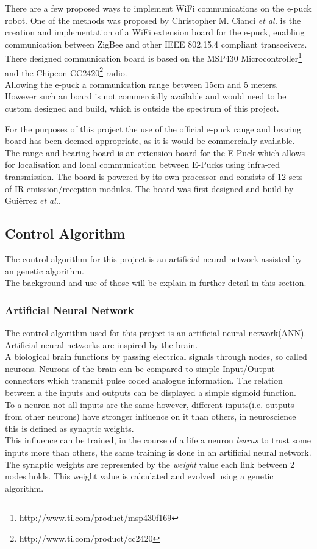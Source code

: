 There are a few proposed ways to implement WiFi communications on the e-puck robot. 
One of the methods was proposed by Christopher M. Cianci \textit{et al.}\cite{Cianci2007Communication} is the creation and implementation of a WiFi extension board for the e-puck, enabling communication between ZigBee and other IEEE 802.15.4 compliant transceivers. \\
There designed communication board is based on the MSP430 Microcontroller\footnote{\url{http://www.ti.com/product/msp430f169}} and the Chipcon CC2420\footnote{http://www.ti.com/product/cc2420} radio.\\
Allowing the e-puck a communication range between 15cm and 5 meters. \\
However such an board is not commercially available and would need to be custom designed and build, which is outside the spectrum of this project.

For the purposes of this project the use of the official e-puck range and bearing board has been deemed appropriate, as it is would be commercially available.\\
The range and bearing board is an extension board for the E-Puck which allows for localisation and local communication between E-Pucks using infra-red transmission. 
The board is powered by its own processor and consists of 12 sets of IR emission/reception modules. 
The board was first designed and build by Guiêrrez \textit{et al.}\cite{Gutierrez}. 

\subsection{Control Algorithm}
The control algorithm for this project is an artificial neural network assisted by an genetic algorithm.\\
The background and use of those will be explain in further detail in this section.

\subsubsection{Artificial Neural Network}
The control algorithm used for this project is an artificial neural network(ANN).
Artificial neural networks are inspired by the brain. \\
A biological brain functions by passing electrical signals through nodes, so called neurons. Neurons of the brain can be compared to simple Input/Output connectors which transmit pulse coded analogue information. The relation between a the inputs and outputs can be displayed a simple sigmoid function\cite{Hopfield}.\\
To a neuron not all inputs are the same however, different inputs(i.e. outputs from other neurons) have stronger influence on it than others, in neuroscience this is defined as synaptic weights. \\
This influence can be trained, in the course of a life a neuron \textit{learns} to trust some inputs more than others, the same training is done in an artificial neural network. The synaptic weights are represented by the \textit{weight} value each link between 2 nodes holds. This weight value is calculated and evolved using a genetic algorithm. 

